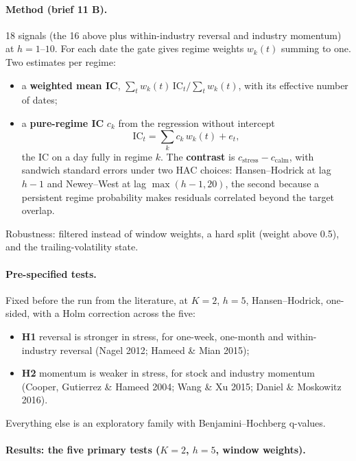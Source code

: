 \paragraph{Method (brief 11 B).} 18 signals (the 16 above plus within-industry reversal and industry momentum) at
$h=1$--$10$. For each date the gate gives regime weights $w_k(t)$ summing to one. Two estimates per regime:
\begin{itemize}
\item a \textbf{weighted mean IC}, $\sum_t w_k(t)\,\mathrm{IC}_t / \sum_t w_k(t)$, with its effective number of dates;
\item a \textbf{pure-regime IC} $c_k$ from the regression without intercept
  \[\mathrm{IC}_t=\sum_k c_k\,w_k(t)+e_t,\]
  the IC on a day fully in regime $k$. The \textbf{contrast} is $c_{\text{stress}}-c_{\text{calm}}$, with sandwich
  standard errors under two HAC choices: Hansen--Hodrick at lag $h-1$ and Newey--West at lag $\max(h-1,20)$, the
  second because a persistent regime probability makes residuals correlated beyond the target overlap.
\end{itemize}
Robustness: filtered instead of window weights, a hard split (weight above 0.5), and the trailing-volatility state.

\paragraph{Pre-specified tests.} Fixed before the run from the literature, at $K=2$, $h=5$, Hansen--Hodrick, one-sided,
with a Holm correction across the five:
\begin{itemize}
\item \textbf{H1} reversal is stronger in stress, for one-week, one-month and within-industry reversal (Nagel 2012;
  Hameed \& Mian 2015);
\item \textbf{H2} momentum is weaker in stress, for stock and industry momentum (Cooper, Gutierrez \& Hameed 2004;
  Wang \& Xu 2015; Daniel \& Moskowitz 2016).
\end{itemize}
Everything else is an exploratory family with Benjamini--Hochberg q-values.

\paragraph{Results: the five primary tests ($K=2$, $h=5$, window weights).}\mbox{}\par\smallskip

